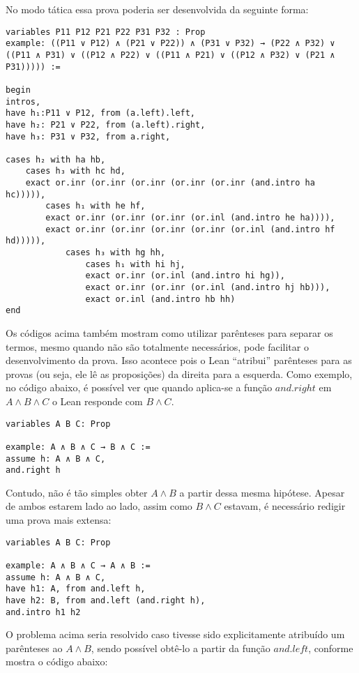 No modo tática essa prova poderia ser desenvolvida da seguinte forma:

\begin{lstlisting}
variables P11 P12 P21 P22 P31 P32 : Prop
example: ((P11 ∨ P12) ∧ (P21 ∨ P22)) ∧ (P31 ∨ P32) → (P22 ∧ P32) ∨ ((P11 ∧ P31) ∨ ((P12 ∧ P22) ∨ ((P11 ∧ P21) ∨ ((P12 ∧ P32) ∨ (P21 ∧ P31))))) :=

begin
intros,
have h₁:P11 ∨ P12, from (a.left).left,
have h₂: P21 ∨ P22, from (a.left).right,
have h₃: P31 ∨ P32, from a.right,

cases h₂ with ha hb,
    cases h₃ with hc hd,
    exact or.inr (or.inr (or.inr (or.inr (or.inr (and.intro ha hc))))),
        cases h₁ with he hf,
        exact or.inr (or.inr (or.inr (or.inl (and.intro he ha)))),
        exact or.inr (or.inr (or.inr (or.inr (or.inl (and.intro hf hd))))),
            cases h₃ with hg hh,
                cases h₁ with hi hj,
                exact or.inr (or.inl (and.intro hi hg)),
                exact or.inr (or.inr (or.inl (and.intro hj hb))),
                exact or.inl (and.intro hb hh)
end
\end{lstlisting}

Os códigos acima também mostram como utilizar parênteses para separar os termos, mesmo quando não são totalmente necessários, pode facilitar o desenvolvimento da prova. Isso acontece pois o Lean ``atribui'' parênteses para as provas (ou seja, ele lê as proposições) da direita para a esquerda. Como exemplo, no código abaixo, é possível ver que quando aplica-se a função $and.right$ em $A \land B \land C$ o Lean responde com $B \land C$.

\begin{lstlisting}
variables A B C: Prop

example: A ∧ B ∧ C → B ∧ C :=
assume h: A ∧ B ∧ C,
and.right h
\end{lstlisting}

Contudo, não é tão simples obter $A \land B$ a partir dessa mesma hipótese. Apesar de ambos estarem lado ao lado, assim como $B \land C$ estavam, é necessário redigir uma prova mais extensa:

\begin{lstlisting}
variables A B C: Prop

example: A ∧ B ∧ C → A ∧ B :=
assume h: A ∧ B ∧ C,
have h1: A, from and.left h,
have h2: B, from and.left (and.right h),
and.intro h1 h2
\end{lstlisting}

O problema acima seria resolvido caso tivesse sido explicitamente atribuído um parênteses ao $A \land B$, sendo possível obtê-lo a partir da função $and.left$, conforme mostra o código abaixo:

